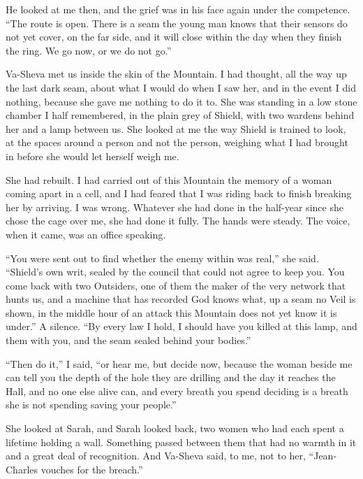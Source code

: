 He looked at me then, and the grief was in his face again under the competence. ``The route is open. There is a seam the young man knows that their sensors do not yet cover, on the far side, and it will close within the day when they finish the ring. We go now, or we do not go.''\par

\ornament

Va-Sheva met us inside the skin of the Mountain. I had thought, all the way up the last dark seam, about what I would do when I saw her, and in the event I did nothing, because she gave me nothing to do it to. She was standing in a low stone chamber I half remembered, in the plain grey of Shield, with two wardens behind her and a lamp between us. She looked at me the way Shield is trained to look, at the spaces around a person and not the person, weighing what I had brought in before she would let herself weigh me.\par

She had rebuilt. I had carried out of this Mountain the memory of a woman coming apart in a cell, and I had feared that I was riding back to finish breaking her by arriving. I was wrong. Whatever she had done in the half-year since she chose the cage over me, she had done it fully. The hands were steady. The voice, when it came, was an office speaking.\par

``You were sent out to find whether the enemy within was real,'' she said. ``Shield's own writ, sealed by the council that could not agree to keep you. You come back with two Outsiders, one of them the maker of the very network that hunts us, and a machine that has recorded God knows what, up a seam no Veil is shown, in the middle hour of an attack this Mountain does not yet know it is under.'' A silence. ``By every law I hold, I should have you killed at this lamp, and them with you, and the seam sealed behind your bodies.''\par

``Then do it,'' I said, ``or hear me, but decide now, because the woman beside me can tell you the depth of the hole they are drilling and the day it reaches the Hall, and no one else alive can, and every breath you spend deciding is a breath she is not spending saving your people.''\par

She looked at Sarah, and Sarah looked back, two women who had each spent a lifetime holding a wall. Something passed between them that had no warmth in it and a great deal of recognition. And Va-Sheva said, to me, not to her, ``Jean-Charles vouches for the breach.''\par

